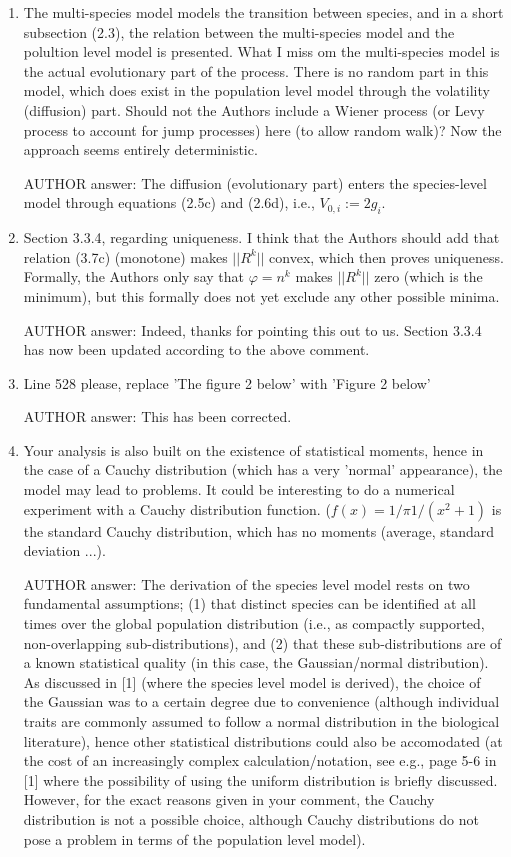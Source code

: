 \documentclass[a4paper,11pt]{scrartcl}
\let\phi\varphi
\begin{document}
\begin{enumerate}
\item
The multi-species model models the transition between species, and in a short subsection (2.3), the relation between the multi-species model and the polultion level model is presented. What I miss om the multi-species model is the actual evolutionary part of the process. There is no random part in this model, which does exist in the population level model through the volatility (diffusion) part. Should not the Authors include a Wiener process (or Levy process to account for jump processes) here (to allow random walk)? Now the approach seems entirely deterministic.

AUTHOR answer: The diffusion (evolutionary part) enters the species-level model through equations (2.5c) and (2.6d), i.e., $V_{0,i} := 2g_i$.

\item
Section 3.3.4, regarding uniqueness. I think that the Authors should add that relation (3.7c) (monotone) makes $||R^k||$ convex, which then proves uniqueness. Formally, the Authors only say that $\phi = n^k$ makes $||R^k||$ zero (which is the minimum), but this formally does not yet exclude any other possible minima.

AUTHOR answer: Indeed, thanks for pointing this out to us. Section 3.3.4 has now been updated according to the above comment.

\item
Line 528 please, replace 'The figure 2 below' with 'Figure 2 below'

AUTHOR answer: This has been corrected.

\item
Your analysis is also built on the existence of statistical moments, hence in the case of a Cauchy distribution (which has a very 'normal' appearance), the model may lead to problems. It could be interesting to do a numerical experiment with a Cauchy distribution function. ($f(x) = 1/\pi 1 / (x^2 + 1)$ is the standard Cauchy distribution, which has no moments (average, standard deviation ...).

AUTHOR answer: The derivation of the species level model rests on two fundamental assumptions; (1) that distinct species can be identified at all times over the global population distribution (i.e., as compactly supported, non-overlapping sub-distributions), and (2) that these sub-distributions are of a known statistical quality (in this case, the Gaussian/normal distribution). As discussed in [1] (where the species level model is derived), the choice of the Gaussian was to a certain degree due to convenience (although individual traits are commonly assumed to follow a normal distribution in the biological literature), hence other statistical distributions could also be accomodated (at the cost of an increasingly complex calculation/notation, see e.g., page 5-6 in [1] where the possibility of using the uniform distribution is briefly discussed. However, for the exact reasons given in your comment, the Cauchy distribution is not a possible choice, although Cauchy distributions do not pose a problem in terms of the population level model). \\


\end{enumerate}
\end{document}
